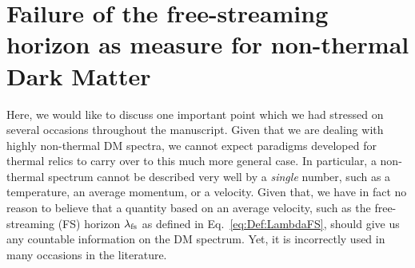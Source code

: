 \section{\label{app:C:FSvsHalfMode}Failure of the free-streaming horizon as measure for non-thermal Dark Matter}
\renewcommand{\theequation}{C-\arabic{equation}}
\setcounter{equation}{0}  %

Here, we would like to discuss one important point which we had stressed on several occasions throughout the manuscript. Given that we are dealing with highly non-thermal DM spectra, we cannot expect paradigms developed for thermal relics to carry over to this much more general case. In particular, a non-thermal spectrum cannot be described very well by a \emph{single} number, such as a temperature, an average momentum, or a velocity. Given that, we have in fact no reason to believe that a quantity based on an average velocity, such as the free-streaming (FS) horizon $\lambda_{\rm fs}$ as defined in Eq.~\eqref{eq:Def:LambdaFS}, should give us any countable information on the DM spectrum. Yet, it is incorrectly used in many occasions in the literature.

